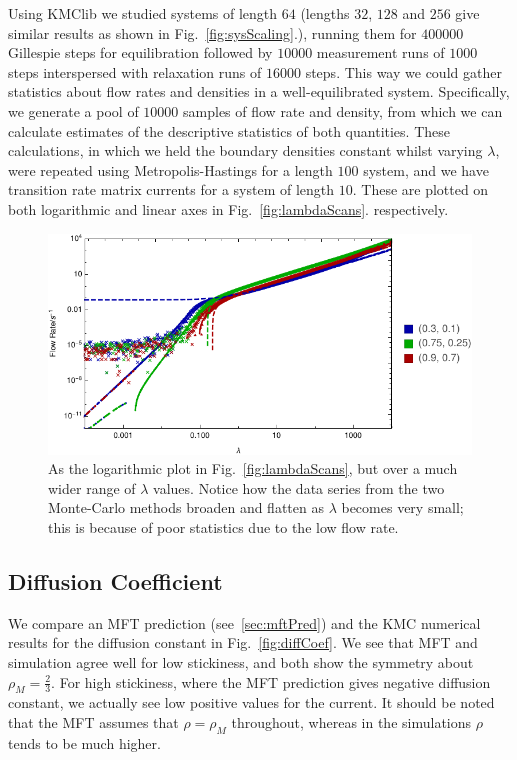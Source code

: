 \documentclass[
reprint, amsmath,amssymb,
]{revtex4-1}
\begin{document}
Using KMClib we studied systems of length $64$ (lengths $32$, $128$ and $256$ give similar
results as shown in Fig.~\ref{fig:sysScaling}.), running them for $400000$ Gillespie steps for equilibration
followed by $10000$ measurement runs of $1000$ steps interspersed with
relaxation runs of $16000$ steps. This way we could gather statistics
about flow rates and densities in a well-equilibrated
system. Specifically, we generate a pool of $10000$ samples of flow
rate and density, from which we can calculate estimates of the
descriptive statistics of both quantities.
These calculations, in which we held the boundary densities constant whilst varying $\lambda$, were repeated using Metropolis-Hastings for a length $100$ system, and we have transition rate matrix currents
for a system of length $10$. These are plotted on both logarithmic and linear axes in Fig.~\ref{fig:lambdaScans}.
respectively.

\begin{figure}[h!]
\vspace{0em}
\begin{center}
    \includegraphics[width=1\linewidth]{allDataWide}
\end{center}
\caption{\label{fig:wideScans} As the logarithmic plot in Fig.~\ref{fig:lambdaScans}, but over a much wider range of $\lambda$ values. Notice how the data series from the two Monte-Carlo
methods broaden and flatten as $\lambda$ becomes very small; this is because of poor statistics due to the low flow rate.
}
    \vspace{0em}
\end{figure}

\subsection{Diffusion Coefficient}
We compare an MFT prediction (see~\ref{sec:mftPred}) and the KMC numerical results for the
diffusion constant in Fig.~\ref{fig:diffCoef}. We see that MFT and
simulation agree well for low stickiness, and both show the symmetry
about $\rho_M = \frac{2}{3}$. For high stickiness, where the MFT
prediction gives negative diffusion constant, we actually see low
positive values for the current.  It should be noted that the MFT
assumes that $\rho = \rho_M$ throughout, whereas in the simulations $\rho$ tends to be much higher.
\end{document}
